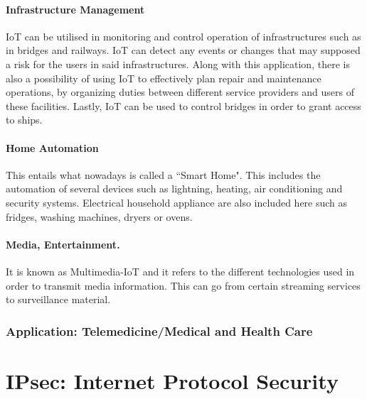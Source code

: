 \documentclass[11pt]{book}
\begin{document}
\subsubsection{Infrastructure Management}
IoT can be utilised in monitoring and control operation of infrastructures such as in bridges and railways. IoT can detect any events or changes that may supposed a risk for the users in said infrastructures. Along with this application, there is also a possibility of using IoT to effectively plan repair and maintenance operations, by organizing duties between different service providers and users of these facilities. Lastly, IoT can be used to control bridges in order to grant access to ships. 
\subsubsection{Home Automation}
This entails what nowadays is called a ``Smart Home". This includes the automation of several devices such as lightning, heating, air conditioning and security systems. Electrical household appliance are also included here such as fridges, washing machines, dryers or ovens. 
\subsubsection{Media, Entertainment.}
It is known as Multimedia-IoT and it refers to the different technologies used in order to transmit media information. This can go from certain streaming services to surveillance material. 
\subsection{Application: Telemedicine/Medical and Health Care}
\chapter{IPsec: Internet Protocol Security}
\end{document}
